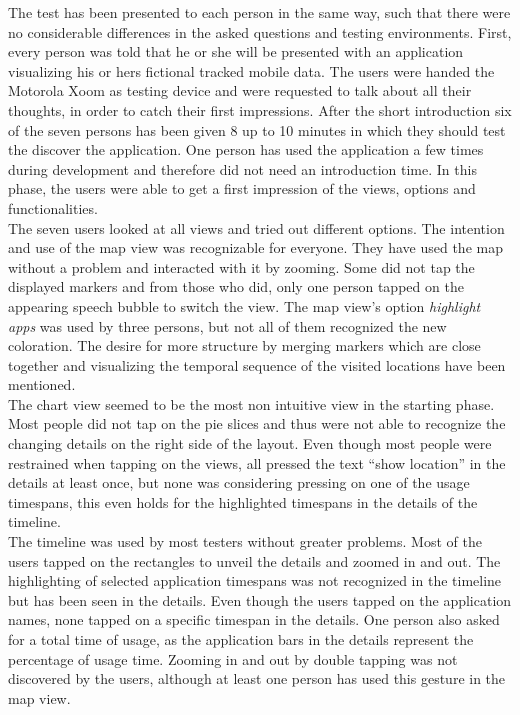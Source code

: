 The  test has been presented to each person in the same way, such that there were no considerable differences in the asked questions and testing environments. First, every person was told that he or she will be presented with an application visualizing his or hers fictional tracked mobile data. The users were handed the Motorola Xoom as testing device and were requested to talk about all their thoughts, in order to catch their first impressions. After the short introduction six of the seven persons has been given 8 up to 10 minutes in which they should test the discover the application. One person has used the application a few times during development and therefore did not need an introduction time. In this phase, the users were able to get a first impression of the views, options and functionalities.\\
The  seven users looked at all views and tried out different options. The intention and use of the map view was recognizable for everyone. They have used the map without a problem and interacted with it by zooming. Some did not tap the displayed markers and from those who did, only one person tapped on the appearing speech bubble to switch the view. The map view's option \emph{highlight apps} was used by three persons, but not all of them recognized the new coloration. The desire for more structure by merging markers which are close together and visualizing the temporal sequence of the visited locations have been mentioned.\\
The  chart view seemed to be the most non intuitive view in the starting phase. Most people did not tap on the pie slices and thus were not able to recognize the changing details on the right side of the layout. Even though most people were restrained when tapping on the views, all pressed the text ``show location'' in the details at least once, but none was considering pressing on one of the usage timespans, this even holds for the highlighted timespans in the details of the timeline.\\
The  timeline was used by most testers without greater problems. Most of the users tapped on the rectangles to unveil the details and zoomed in and out. The highlighting of selected application timespans was not recognized in the timeline but has been seen in the details. Even though the users tapped on the application names, none tapped on a specific timespan in the details. One person also asked for a total time of usage, as the application bars in the details represent the percentage of usage time. Zooming in and out by double tapping was not discovered by the users, although at least one person has used this gesture in the map view.\\
